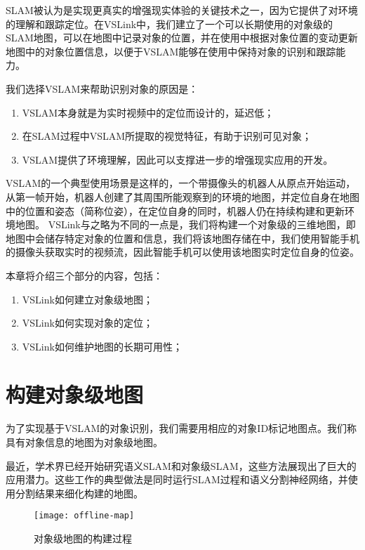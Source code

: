SLAM被认为是实现更真实的增强现实体验的关键技术之一，因为它提供了对环境的理解和跟踪定位。在VSLink中，我们建立了一个可以长期使用的对象级的SLAM地图，可以在地图中记录对象的位置，并在使用中根据对象位置的变动更新地图中的对象位置信息，以便于VSLAM能够在使用中保持对象的识别和跟踪能力。

我们选择VSLAM来帮助识别对象的原因是：

\begin{enumerate}
	\item VSLAM本身就是为实时视频中的定位而设计的，延迟低；
	\item 在SLAM过程中VSLAM所提取的视觉特征，有助于识别可见对象；
	\item VSLAM提供了环境理解，因此可以支撑进一步的增强现实应用的开发。
\end{enumerate}

VSLAM的一个典型使用场景是这样的，一个带摄像头的机器人从原点开始运动，从第一帧开始，机器人创建了其周围所能观察到的环境的地图，并定位自身在地图中的位置和姿态（简称位姿），在定位自身的同时，机器人仍在持续构建和更新环境地图。
VSLink与之略为不同的一点是，我们将构建一个对象级的三维地图，即地图中会储存特定对象的位置和信息，我们将该地图存储在{\edg}中，我们使用智能手机的摄像头获取实时的视频流，因此智能手机可以使用该地图实时定位自身的位姿。

本章将介绍三个部分的内容，包括：
\begin{enumerate}
	\item VSLink如何建立对象级地图；
	\item VSLink如何实现对象的定位；
	\item VSLink如何维护地图的长期可用性；
\end{enumerate}

\section{构建对象级地图}
\label{sec:map}
为了实现基于VSLAM的对象识别，我们需要用相应的对象ID标记地图点。我们称具有对象信息的地图为对象级地图。

最近，学术界已经开始研究语义SLAM\cite{bowman2017probabilistic,kaneko2018mask}和对象级SLAM\cite{mccormac2018fusion++,strecke2019fusion}，这些方法展现出了巨大的应用潜力。这些工作的典型做法是同时运行SLAM过程和语义分割神经网络，并使用分割结果来细化构建的地图。

\begin{figure}[htbp]
	\centering
	\texttt{[image: offline-map]}
	\caption{对象级地图的构建过程}
	\label{fig:offlinemap}
\end{figure}

